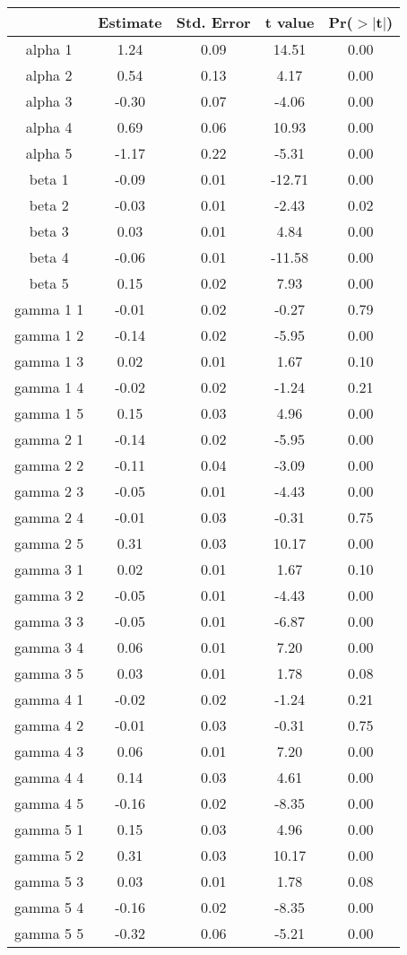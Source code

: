 \begin{tabular}{ccccc}
  \hline
 & Estimate & Std. Error & t value & Pr($>$$|$t$|$) \\ 
  \hline
alpha 1 & 1.24 & 0.09 & 14.51 & 0.00 \\ 
  alpha 2 & 0.54 & 0.13 & 4.17 & 0.00 \\ 
  alpha 3 & -0.30 & 0.07 & -4.06 & 0.00 \\ 
  alpha 4 & 0.69 & 0.06 & 10.93 & 0.00 \\ 
  alpha 5 & -1.17 & 0.22 & -5.31 & 0.00 \\ 
  beta 1 & -0.09 & 0.01 & -12.71 & 0.00 \\ 
  beta 2 & -0.03 & 0.01 & -2.43 & 0.02 \\ 
  beta 3 & 0.03 & 0.01 & 4.84 & 0.00 \\ 
  beta 4 & -0.06 & 0.01 & -11.58 & 0.00 \\ 
  beta 5 & 0.15 & 0.02 & 7.93 & 0.00 \\ 
  gamma 1 1 & -0.01 & 0.02 & -0.27 & 0.79 \\ 
  gamma 1 2 & -0.14 & 0.02 & -5.95 & 0.00 \\ 
  gamma 1 3 & 0.02 & 0.01 & 1.67 & 0.10 \\ 
  gamma 1 4 & -0.02 & 0.02 & -1.24 & 0.21 \\ 
  gamma 1 5 & 0.15 & 0.03 & 4.96 & 0.00 \\ 
  gamma 2 1 & -0.14 & 0.02 & -5.95 & 0.00 \\ 
  gamma 2 2 & -0.11 & 0.04 & -3.09 & 0.00 \\ 
  gamma 2 3 & -0.05 & 0.01 & -4.43 & 0.00 \\ 
  gamma 2 4 & -0.01 & 0.03 & -0.31 & 0.75 \\ 
  gamma 2 5 & 0.31 & 0.03 & 10.17 & 0.00 \\ 
  gamma 3 1 & 0.02 & 0.01 & 1.67 & 0.10 \\ 
  gamma 3 2 & -0.05 & 0.01 & -4.43 & 0.00 \\ 
  gamma 3 3 & -0.05 & 0.01 & -6.87 & 0.00 \\ 
  gamma 3 4 & 0.06 & 0.01 & 7.20 & 0.00 \\ 
  gamma 3 5 & 0.03 & 0.01 & 1.78 & 0.08 \\ 
  gamma 4 1 & -0.02 & 0.02 & -1.24 & 0.21 \\ 
  gamma 4 2 & -0.01 & 0.03 & -0.31 & 0.75 \\ 
  gamma 4 3 & 0.06 & 0.01 & 7.20 & 0.00 \\ 
  gamma 4 4 & 0.14 & 0.03 & 4.61 & 0.00 \\ 
  gamma 4 5 & -0.16 & 0.02 & -8.35 & 0.00 \\ 
  gamma 5 1 & 0.15 & 0.03 & 4.96 & 0.00 \\ 
  gamma 5 2 & 0.31 & 0.03 & 10.17 & 0.00 \\ 
  gamma 5 3 & 0.03 & 0.01 & 1.78 & 0.08 \\ 
  gamma 5 4 & -0.16 & 0.02 & -8.35 & 0.00 \\ 
  gamma 5 5 & -0.32 & 0.06 & -5.21 & 0.00 \\ 
   \hline
\end{tabular}
